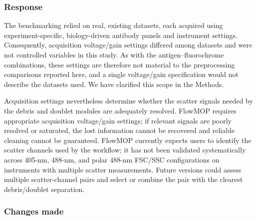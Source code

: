 \documentclass[
  11pt,
  a4paper,
]{article}
\begin{document}
\subsubsection{Response}\label{response-7}

The benchmarking relied on real, existing datasets, each acquired using
experiment-specific, biology-driven antibody panels and instrument
settings. Consequently, acquisition voltage/gain settings differed among
datasets and were not controlled variables in this study. As with the
antigen--fluorochrome combinations, these settings are therefore not
material to the preprocessing comparisons reported here, and a single
voltage/gain specification would not describe the datasets used. We have
clarified this scope in the Methods.

Acquisition settings nevertheless determine whether the scatter signals
needed by the debris and doublet modules are adequately resolved.
FlowMOP requires appropriate acquisition voltage/gain settings; if
relevant signals are poorly resolved or saturated, the lost information
cannot be recovered and reliable cleaning cannot be guaranteed. FlowMOP
currently expects users to identify the scatter channels used by the
workflow; it has not been validated systematically across 405-nm,
488-nm, and polar 488-nm FSC/SSC configurations on instruments with
multiple scatter measurements. Future versions could assess multiple
scatter-channel pairs and select or combine the pair with the clearest
debris/doublet separation.

\subsubsection{Changes made}\label{changes-made-7}
\end{document}
